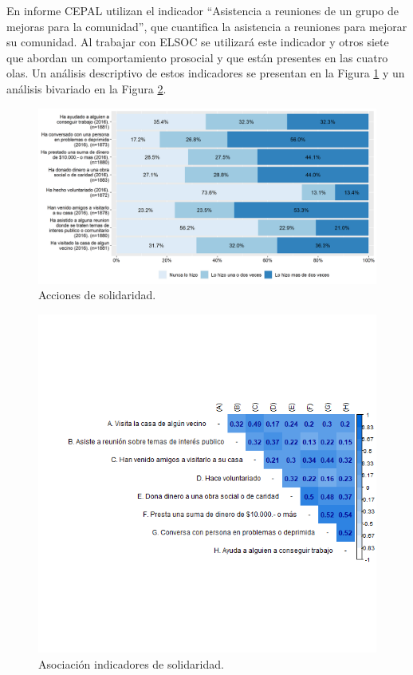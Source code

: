 \documentclass[
  12pt,
]{book}
\begin{document}
En informe CEPAL utilizan el indicador ``Asistencia a reuniones de un grupo de mejoras para la comunidad'', que cuantifica la asistencia a reuniones para mejorar su comunidad. Al trabajar con ELSOC se utilizará este indicador y otros siete que abordan un comportamiento prosocial y que están presentes en las cuatro olas. Un análisis descriptivo de estos indicadores se presentan en la Figura \ref{fig:solidaridad} y un análisis bivariado en la Figura \ref{fig:solidaridad-cor}.

\begin{figure}[H]

{\centering \includegraphics[width=1\linewidth,height=1\textheight]{output/graphs/solidaridad} 

}

\caption{Acciones de solidaridad.}\label{fig:solidaridad}
\end{figure}

\begin{figure}[H]

{\centering \includegraphics[width=1\linewidth,height=1\textheight]{output/graphs/solidaridad_cor} 

}

\caption{Asociación indicadores de solidaridad.}\label{fig:solidaridad-cor}
\end{figure}
\end{document}

